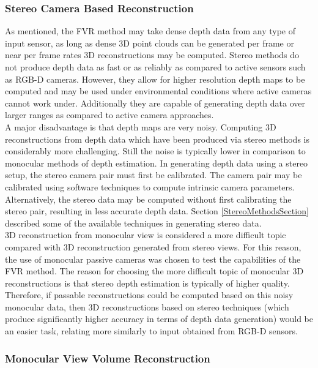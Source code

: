 \subsubsection{Stereo Camera Based Reconstruction}

As mentioned, the FVR method may take dense depth data from any type of input sensor, as long as dense 3D point clouds can be generated per frame or near per frame rates 3D reconstructions may be computed. Stereo methods do not produce depth data as fast or as reliably as compared to active sensors such as RGB-D cameras. However, they allow for higher resolution depth maps to be computed and may be used under environmental conditions where active cameras cannot work under. Additionally they are capable of generating depth data over larger ranges as compared to active camera approaches. \\

A major disadvantage is that depth maps are very noisy. Computing 3D reconstructions from depth data which have been produced via stereo methods is considerably more challenging. Still the noise is typically lower in comparison to monocular methods of depth estimation. In generating depth data using a stereo setup, the stereo camera pair must first be calibrated. The camera pair may be calibrated using software techniques to compute intrinsic camera parameters. Alternatively, the stereo data may be computed without first calibrating the stereo pair, resulting in less accurate depth data. Section \ref{StereoMethodsSection} described some of the available techniques in generating stereo data. \\

3D reconstruction from monocular view is considered a more difficult topic compared with 3D reconstruction generated from stereo views. For this reason, the use of monocular passive cameras was chosen to test the capabilities of the FVR method. The reason for choosing the more difficult topic of monocular 3D reconstructions is that stereo depth estimation is typically of higher quality. Therefore, if passable reconstructions could be computed based on this noisy monocular data, then 3D reconstructions based on stereo techniques (which produce significantly higher accuracy in terms of depth data generation) would be an easier task, relating more similarly to input obtained from RGB-D sensors. \\ 

\subsubsection{Monocular View Volume Reconstruction}


